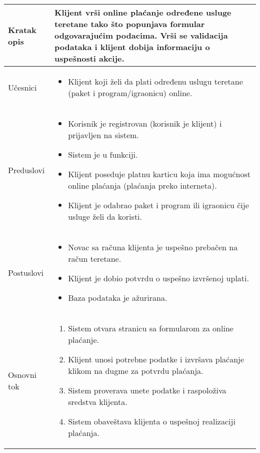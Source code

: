 \documentclass[../main.tex]{subfiles}
\begin{document}

\begin{longtable}{| p{} | p{} |} 
\hline
    Kratak opis & Klijent vrši online plaćanje određene usluge teretane tako što popunjava formular odgovarajućim podacima. Vrši se validacija podataka i klijent dobija informaciju o uspešnosti akcije.\\ 
\hline    
    Učesnici & \begin{itemize}
        \item Klijent koji želi da plati određenu uslugu teretane (paket i program/igraonicu) online.
    \end{itemize} \\
\hline
   Preduslovi & \begin{itemize}
       \item Korisnik je registrovan (korisnik je klijent) i prijavljen na sistem.
       \item Sistem je u funkciji.
       \item Klijent poseduje platnu karticu koja ima mogućnost online plaćanja (plaćanja preko interneta).
       \item Klijent je odabrao paket i program ili igraonicu čije usluge želi da koristi.
   \end{itemize}\\
\hline  
    Postuslovi & \begin{itemize}
        \item Novac sa računa klijenta je uspešno prebačen na račun teretane.
		\item Klijent je dobio potvrdu o uspešno izvršenoj uplati. %
        \item Baza podataka je ažurirana.
    \end{itemize}\\
\hline
    Osnovni tok & \begin{enumerate}
 		\item Sistem otvara stranicu sa formularom za online plaćanje.
		\item Klijent unosi potrebne podatke i izvršava plaćanje klikom na dugme za potvrdu plaćanja.
		\item Sistem proverava unete podatke i raspoloživa sredstva klijenta.
		\item Sistem obaveštava klijenta o uspešnoj realizaciji plaćanja.

\end{enumerate}
\end{longtable}
\end{document}

